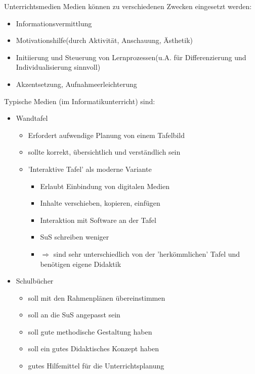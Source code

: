 \documentclass{article}
\begin{document}
\begin{block}{Unterrichtsmedien}
    Medien können zu verschiedenen Zwecken eingesetzt werden:
    \begin{itemize}
        \item Informationsvermittlung
        \item Motivationshilfe(durch Aktivität, Anschauung, Ästhetik)
        \item Initiierung und Steuerung von Lernprozessen(u.A. für Differenzierung und Individualisierung sinnvoll)
        \item Akzentsetzung, Aufnahmeerleichterung
    \end{itemize}
    Typische Medien (im Informatikunterricht) sind:
    \begin{itemize}
        \item Wandtafel
        \begin{itemize}
            \item Erfordert aufwendige Planung von einem Tafelbild
            \item sollte korrekt, übersichtlich und verständlich sein
            \item 'Interaktive Tafel' als moderne Variante
            \begin{itemize}
                \item Erlaubt Einbindung von digitalen Medien
                \item Inhalte verschieben, kopieren, einfügen
                \item Interaktion mit Software an der Tafel
                \item SuS schreiben weniger
                \item $\Rightarrow$ sind sehr unterschiedlich von der 'herkömmlichen' Tafel und benötigen eigene Didaktik
            \end{itemize}
        \end{itemize}
        \item Schulbücher
        \begin{itemize}
            \item soll mit den Rahmenplänen übereinstimmen
            \item soll an die SuS angepasst sein
            \item soll gute methodische Gestaltung haben
            \item soll ein gutes Didaktisches Konzept haben
            \item gutes Hilfemittel für die Unterrichtsplanung

\end{itemize}
\end{itemize}
\end{block}
\end{document}
